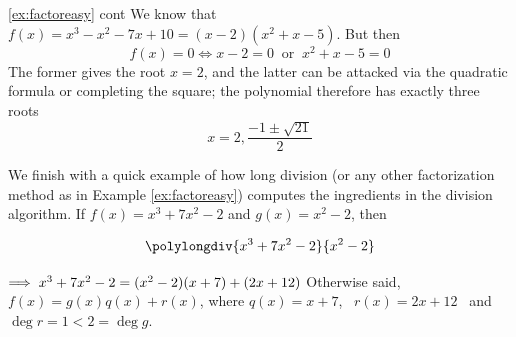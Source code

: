 
\begin{example*}{\ref{ex:factoreasy} cont}{}
We know that $f(x)=x^3-x^2-7x+10=(x-2)(x^2+x-5)$. But then
\[f(x)=0\iff x-2=0\ \text{ or }\ x^2+x-5=0\]
The former gives the root $x=2$, and the latter can be attacked via the quadratic formula or completing the square; the polynomial therefore has exactly three roots
\[x=2,\frac{-1\pm\sqrt{21}}2\] 
\end{example*}


\begin{example}{}{}
We finish with a quick example of how long division (or any other factorization method as in Example \ref{ex:factoreasy}) computes the ingredients in the division algorithm.\smallbreak
If $f(x)=x^3+7x^2-2$ and $g(x)=x^2-2$, then\par
\begin{minipage}[t]{0.35\linewidth}\vspace{-13pt}
\[\polylongdiv{x^3+7x^2-2}{x^2-2}\]
\end{minipage}\hfill\begin{minipage}[t]{0.6\linewidth}\vspace{10pt}
$\negthickspace\implies x^3+7x^2-2=(x^2-2)(x+7)+(2x+12)$\medbreak
Otherwise said, $f(x)=g(x)q(x)+r(x)$, where\medbreak
$q(x)=x+7$, \ $r(x)=2x+12$ \ and \ $\deg r=1<2=\deg g$.
\end{minipage}
\end{example}

\goodbreak



